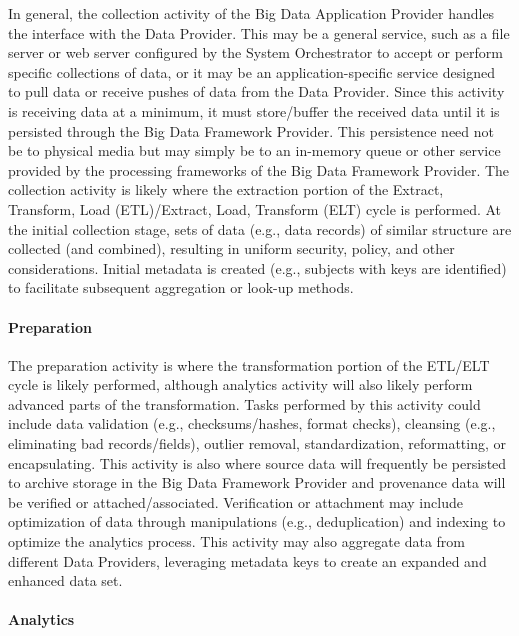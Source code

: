 \documentclass[10pt]{article}
\begin{document}
In general, the collection activity of the Big Data Application
Provider handles the interface with the Data Provider. This may be a
general service, such as a file server or web server configured by the
System Orchestrator to accept or perform specific collections of data,
or it may be an application-specific service designed to pull data or
receive pushes of data from the Data Provider. Since this activity is
receiving data at a minimum, it must store/buffer the received data
until it is persisted through the Big Data Framework Provider. This
persistence need not be to physical media but may simply be to an
in-memory queue or other service provided by the processing frameworks
of the Big Data Framework Provider. The collection activity is likely
where the extraction portion of the Extract, Transform, Load
(ETL)/Extract, Load, Transform (ELT) cycle is performed. At the
initial collection stage, sets of data (e.g., data records) of similar
structure are collected (and combined), resulting in uniform security,
policy, and other considerations. Initial metadata is created (e.g.,
subjects with keys are identified) to facilitate subsequent
aggregation or look-up methods.

\paragraph{Preparation}

The preparation activity is where the transformation portion of the
ETL/ELT cycle is likely performed, although analytics activity will
also likely perform advanced parts of the transformation. Tasks
performed by this activity could include data validation (e.g.,
checksums/hashes, format checks), cleansing (e.g., eliminating bad
records/fields), outlier removal, standardization, reformatting, or
encapsulating. This activity is also where source data will frequently
be persisted to archive storage in the Big Data Framework Provider and
provenance data will be verified or attached/associated. Verification
or attachment may include optimization of data through manipulations
(e.g., deduplication) and indexing to optimize the analytics process.
This activity may also aggregate data from different Data Providers,
leveraging metadata keys to create an expanded and enhanced data set.

\paragraph{Analytics}
\end{document}
